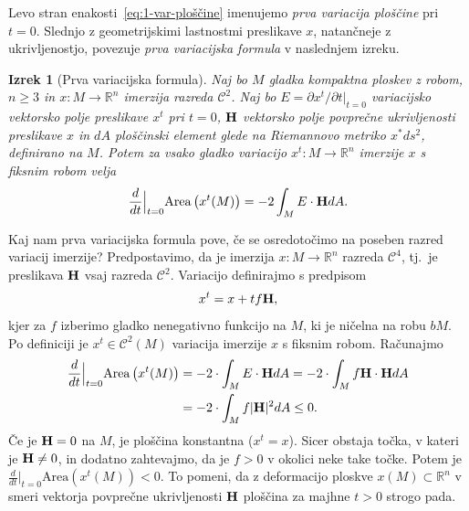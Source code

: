\documentclass[12pt,a4paper,twoside]{article}
\theoremstyle{definition} %
\theoremstyle{plain} %
\newtheorem{izrek}[definicija]{Izrek}
\numberwithin{equation}{section}  %
\newcommand{\R}{\mathbb R}
\begin{document}
Levo stran enakosti~\eqref{eq:1-var-ploščine} imenujemo \emph{prva variacija ploščine} pri $t=0$. Slednjo z geometrijskimi lastnostmi preslikave $x$, natančneje z ukrivljenostjo, povezuje \emph{prva variacijska formula} v naslednjem izreku. 

\begin{izrek}[Prva variacijska formula] \label{izr:1-var-formula}
Naj bo $M$ gladka kompaktna ploskev z robom, $n \geq 3$ in $x \colon M \to \R^{n}$ imerzija razreda $\mathcal{C}^2$. Naj bo $E = \partial{x^{t}} / \partial{t}|_{t=0}$ variacijsko vektorsko polje preslikave $x^{t}$ pri $t=0$, $\textbf{\textup{H}}$ vektorsko polje povprečne ukrivljenosti preslikave $x$ in $dA$ ploščinski element glede na Riemannovo metriko $x^{*}ds^2$, definirano na $M$.
Potem za vsako gladko variacijo $x^{t} \colon M \to \R^{n}$ imerzije $x$ s fiksnim robom velja
\begin{equation} \label{eq:1-var-formula}
\frac{d}{dt} \Big|_{t=0} \text{Area} \left(x^{t}(M)\right) = -2 \int_{M} {E \cdot \textbf{\textup{H}} dA}.
\end{equation}
\end{izrek}

Kaj nam prva variacijska formula pove, če se osredotočimo na poseben razred variacij imerzije? Predpostavimo, da je imerzija $x \colon M \to \R^{n}$ razreda $\mathcal{C}^4$, tj.~je preslikava $\textbf{\textup{H}}$ vsaj razreda $\mathcal{C}^2$. Variacijo definirajmo s predpisom
\begin{equation}
x^{t} = x + tf\textbf{\textup{H}},
\end{equation}
kjer za $f$ izberimo gladko nenegativno funkcijo na $M$, ki je ničelna na robu $bM$. Po definiciji je $x^{t} \in \mathcal{C}^2(M)$ variacija imerzije $x$ s fiksnim robom. Računajmo
\begin{align*}
\frac{d}{dt} \Big|_{t=0} \text{Area} \left(x^{t}(M)\right) &= -2 \cdot \int_{M} E \cdot \textbf{\textup{H}} dA = -2 \cdot \int_{M} f \textbf{\textup{H}} \cdot \textbf{\textup{H}} dA \\
&= -2 \cdot \int_{M} f |\textbf{\textup{H}}|^2 dA \leq 0.
\end{align*} 
Če je $\textbf{\textup{H}} = 0$ na $M$, je ploščina konstantna ($x^{t}=x$).
Sicer obstaja točka, v kateri je $\textbf{\textup{H}} \neq 0$, in dodatno zahtevajmo, da je $f>0$ v okolici neke take točke. Potem je $\frac{d}{dt} \Big|_{t=0} \text{Area}(x^{t}(M)) < 0$.
To pomeni, da z deformacijo ploskve $x(M) \subset \mathbb{R}^{n}$ v smeri vektorja povprečne ukrivljenosti $\textbf{\textup{H}}$ ploščina za majhne $t>0$ strogo pada.
\end{document}

